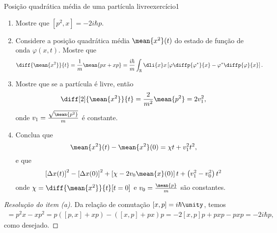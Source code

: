 \begin{exercício}{Posição quadrática média de uma partícula livre}{exercício1}
    \begin{enumerate}[label=(\alph*)]
        \item Mostre que \([p^2, x] = -2i\hbar p\).
        \item Considere a posição quadrática média \(\mean{x^2}(t)\) do estado de função de onda \(\varphi(x,t)\). Mostre que
            \begin{equation*}
                \diff{\mean{x^2}}{t} = \frac{1}{m} \mean{px + xp} = \frac{i\hbar}{m} \int_{\mathbb{R}} \dli{x} x\left[\varphi \diffp{\varphi^*}{x}- \varphi^* \diffp{\varphi}{x}\right].
            \end{equation*}
        \item Mostre que se a partícula é livre, então
            \begin{equation*}
                \diff[2]{\mean{x^2}}{t} = \frac{2}{m^2}\mean{p^2} = 2v_1^2,
            \end{equation*}
            onde \(v_1 = \frac{\sqrt{\mean{p^2}}}{m}\) é constante.
        \item Conclua que
            \begin{equation*}
                \mean{x^2}(t) - \mean{x^2}(0) = \chi t + v_1^2 t^2,
            \end{equation*}
            e que
            \begin{equation*}
                \left[\Delta x(t)\right]^2 - \left[\Delta x(0)\right]^2 + \left[\chi - 2v_0 \mean{x}(0)\right]t + \left(v_1^2 - v_0^2\right)t^2
            \end{equation*}
            onde \(\chi = \diff{\mean{x^2}}{t}[t=0]\) e \(v_0 = \frac{\mean{p}}{m}\) são constantes.
    \end{enumerate}
\end{exercício}
\begin{proof}[Resolução do item (a)]
    Da relação de comutação \([x,p] = i\hbar \unity\), temos
    \begin{align*}
        [p^2, x]
        = p^2 x - xp^2
        = p\left([p,x] + xp\right) - \left([x,p] + px\right)p
        = -2[x,p]p + pxp - pxp
        = - 2i \hbar p,
    \end{align*}
    como desejado.
\end{proof}
